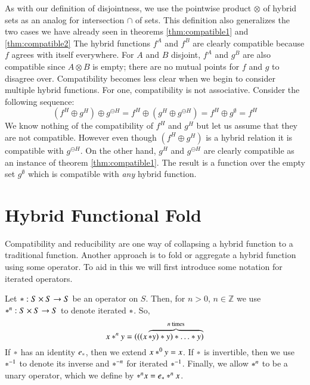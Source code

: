 As with our definition of disjointness, we use the pointwise product $\otimes$ 
of hybrid sets as an analog for intersection $\cap$ of sets.
This definition also generalizes the two cases we have already seen in theorems 
\ref{thm:compatible1} and \ref{thm:compatible2}
The hybrid functions $f^A$ and $f^B$ are clearly compatible because $f$ agrees with itself everywhere.
For $A$ and $B$ disjoint, $f^A$ and $g^B$ are also compatible since $A \otimes B$ is empty;
there are no mutual points for $f$ and $g$ to disagree over.
Compatibility becomes less clear when we begin to consider multiple hybrid functions.
For one, compatibility is not associative.
Consider the following sequence:
\begin{equation*}
	(f^H \oplus g^H) \oplus g^{\ominus H} 
	= f^H \oplus (g^H \oplus g^{\ominus H}) 
	= f^H \oplus g^\emptyset = f^H
\end{equation*}
We know nothing of the compatibility of $f^H$ and $g^H$ but let us assume that they are not compatible.
However even though $(f^H \oplus g^H)$ is a hybrid relation it is compatible with $g^{\ominus H}$.
On the other hand, $g^H$ and $g^{\ominus H}$ are clearly compatible as an instance of theorem \ref{thm:compatible1}.
The result is a function over the empty set $g^{\emptyset}$ which is compatible with \emph{any} hybrid function.




\section{Hybrid Functional Fold}


Compatibility and reducibility are one way of collapsing a hybrid function to a traditional function.
Another approach is to fold or aggregate a hybrid function using some operator.
To aid in this we will first introduce some notation for iterated operators.
\begin{definition}
	Let $* : S \times S \to S$ be an operator on $S$.
	Then, for $n > 0$, $n \in \mathbb{Z}$ we use $*^n:S \times S \to S$ to denote iterated $*$.
	So,
	\begin{equation}
		x *^n y = (((x \overbrace{* y) * y) * \ldots * y)}^{n \text{ times}}
	\end{equation}
	If $*$ has an identity $e_*$, then we extend $x *^0 y = x$.
	If $*$ is invertible, then we use $*^{-1}$ to denote its inverse and $*^{-n}$ for iterated $*^{-1}$.
	Finally, we allow $*^n$ to be a unary operator, which we define by $*^n x = e_* *^n x$.
\end{definition}

